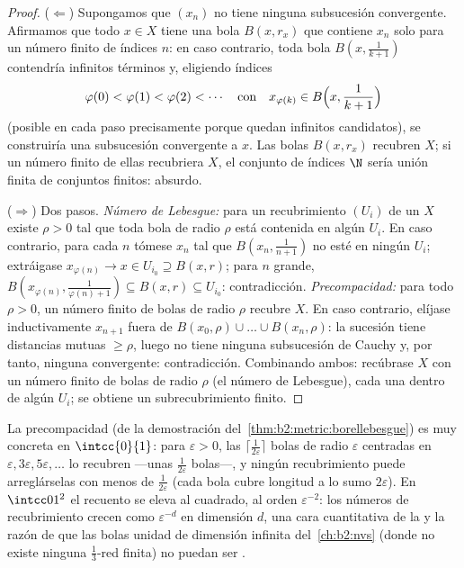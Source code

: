 \begin{proof}
($\Leftarrow$) Supongamos que $(x_n)$ no tiene ninguna subsucesión
convergente. Afirmamos que todo $x \in X$ tiene una bola $B(x,
r_x)$ que contiene $x_n$ solo para un número finito de índices
$n$: en caso contrario, toda bola $B(x, \frac1{k+1})$ contendría
infinitos términos y, eligiendo índices
\[
\varphi(0) < \varphi(1) < \varphi(2) < \cdots
\quad\text{con}\quad
x_{\varphi(k)} \in B\Bigl(x, \frac{1}{k+1}\Bigr)
\]
(posible en cada paso precisamente porque quedan infinitos
candidatos), se construiría una subsucesión convergente a $x$.
Las bolas $B(x, r_x)$ recubren $X$; si un número finito de ellas
recubriera $X$, el conjunto de índices $\N$ sería unión finita de
conjuntos finitos: absurdo.

($\Rightarrow$) Dos pasos. \emph{Número de Lebesgue:} para un
recubrimiento  $(U_i)$ de un  $X$ existe $\rho > 0$
tal que toda bola de radio $\rho$ está contenida en algún $U_i$. En
caso contrario, para cada $n$ tómese $x_n$ tal que $B(x_n,
\frac{1}{n+1})$ no esté en ningún $U_i$; extráigase $x_{\varphi(n)}
\to x \in U_{i_0} \supseteq B(x, r)$; para $n$ grande,
$B(x_{\varphi(n)}, \frac{1}{\varphi(n)+1}) \subseteq B(x, r)
\subseteq U_{i_0}$: contradicción. \emph{Precompacidad:} para todo
$\rho > 0$, un número finito de bolas de radio $\rho$ recubre $X$.
En caso contrario, elíjase inductivamente $x_{n+1}$ fuera de $B(x_0,
\rho) \cup \dots \cup B(x_n, \rho)$: la sucesión tiene distancias
mutuas $\geq \rho$, luego no tiene ninguna subsucesión de Cauchy y,
por tanto, ninguna convergente: contradicción. Combinando ambos:
recúbrase $X$ con un número finito de bolas de radio $\rho$ (el
número de Lebesgue), cada una dentro de algún $U_i$; se obtiene un
subrecubrimiento finito.
\end{proof}

\begin{example}\label{ex:b2:metric:epsnet}
La precompacidad (de la demostración del~\cref{thm:b2:metric:borellebesgue}) es muy concreta en
$\intcc{0}{1}$: para $\varepsilon > 0$, las $\lceil
\frac{1}{2\varepsilon}\rceil$ bolas de radio $\varepsilon$
centradas en $\varepsilon, 3\varepsilon, 5\varepsilon, \dots$ lo
recubren ---unas $\frac1{2\varepsilon}$ bolas---, y ningún
recubrimiento puede arreglárselas con menos de
$\frac{1}{2\varepsilon}$ (cada bola cubre longitud a lo sumo
$2\varepsilon$). En $\intcc01^2$ el recuento se eleva al cuadrado,
al orden $\varepsilon^{-2}$: los números de recubrimiento crecen
como $\varepsilon^{-d}$ en dimensión $d$, una cara cuantitativa de
la  y la razón de que las bolas unidad de dimensión
infinita del~\cref{ch:b2:nvs} (donde no existe ninguna
$\frac13$-red finita) no puedan ser .
\end{example}

